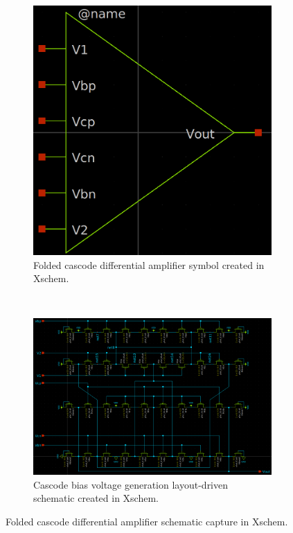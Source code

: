 \documentclass[11pt]{article}
\begin{document}
    \begin{figure}[!ht]
        \centering
        \begin{subfigure}{\linewidth}
            \centering
            \includegraphics[width=0.2\linewidth]{../img/cas_sym.png}
            \caption{Folded cascode differential amplifier symbol created in Xschem.}
        \end{subfigure}\\
        \begin{subfigure}{1.0\linewidth}
            \includegraphics[width=\linewidth]{../img/cas_sch.png}
            \caption{Cascode bias voltage generation layout-driven schematic created in Xschem.}
        \end{subfigure}
        \caption{Folded cascode differential amplifier schematic capture in Xschem.}
        \label{fig:cas_schm}
    \end{figure}
\end{document}
